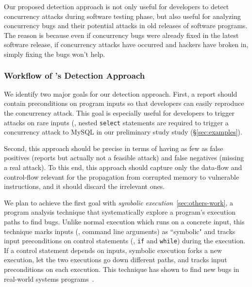Our proposed detection approach is not only useful for developers to detect 
concurrency attacks during software testing phase, but also useful for 
analyzing concurrency bugs and their potential attacks in old releases of 
software programs. The reason is because even if concurrency bugs were already 
fixed in the latest software release, if concurrency attacks have occurred and 
hackers have broken in, simply fixing the bugs won't help.


\vspace{-.15in}\subsubsection{Workflow of \xxx's Detection Approach}
\label{sec:detect-arch}\vspace{-.075in}

We identify two major goals for our detection approach. First, a report should 
contain preconditions on program inputs so that developers can easily reproduce 
the concurrency attack. This goal is especially useful for developers to 
trigger attacks on rare inputs (\eg, nested \texttt{select} statements are 
required to trigger a concurrency attack to MySQL in our preliminary 
study study (\S\ref{sec:examples}).

Second, this approach should be precise in terms of having as few as false 
positives (reports but actually not a feasible attack) and false negatives 
(missing a real attack). To this end, this approach should capture only the 
data-flow and control-flow relevant for the propagation from corrupted memory 
to vulnerable instructions, and it should discard the irrelevant ones. 

We plan to achieve the first goal with \emph{symbolic 
execution}~\ref{sec:others-work}, a program analysis technique that 
systematically explore a program's execution paths to find bugs. Unlike normal 
execution which runs on a concrete input, this technique marks inputs (\eg, 
command line arguments) as ``symbolic" and tracks input preconditions 
on control statements (\eg, \texttt{if} and \texttt{while}) during the 
execution. If a control statement depends on inputs, symbolic execution forks a 
new execution, let the two executions go down different paths, and tracks input 
preconditions on each execution. This technique has shown to find new bugs in 
real-world systems programs~\cite{klee:osdi08}.

